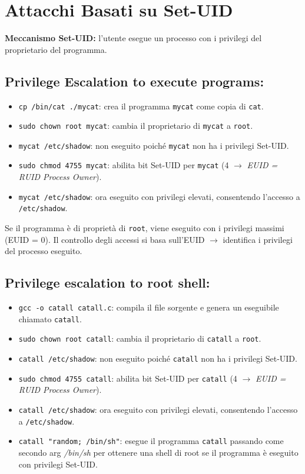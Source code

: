 \section{Attacchi Basati su Set-UID}

\textbf{Meccanismo Set-UID:} l'utente esegue un processo con i privilegi del proprietario del programma. 

\subsection{Privilege Escalation to execute programs:}
\begin{itemize}
    \item \texttt{cp /bin/cat ./mycat}: crea il programma \texttt{mycat} come copia di \texttt{cat}.
    \item \texttt{sudo chown root mycat}: cambia il proprietario di \texttt{mycat} a \texttt{root}.
    \item \texttt{mycat /etc/shadow}: non eseguito poiché \texttt{mycat} non ha i privilegi Set-UID.
    \item \texttt{sudo chmod 4755 mycat}: abilita bit Set-UID per \texttt{mycat} (4 $\rightarrow$ \textit{EUID = RUID Process Owner}).
    \item \texttt{mycat /etc/shadow}: ora eseguito con privilegi elevati, consentendo l'accesso a \texttt{/etc/shadow}.
\end{itemize}

\noindent Se il programma è di proprietà di \texttt{root}, viene eseguito con i privilegi massimi (EUID = 0). Il controllo degli accessi si basa sull'EUID $\rightarrow$ identifica i privilegi del processo eseguito.

\subsection{Privilege escalation to root shell:}
\begin{itemize}
    \item \texttt{gcc -o catall catall.c}: compila il file sorgente e genera un eseguibile chiamato \texttt{catall}.
    \item \texttt{sudo chown root catall}: cambia il proprietario di \texttt{catall} a \texttt{root}.
    \item \texttt{catall /etc/shadow}: non eseguito poiché \texttt{catall} non ha i privilegi Set-UID.
    \item \texttt{sudo chmod 4755 catall}: abilita bit Set-UID per \texttt{catall} (4 $\rightarrow$ \textit{EUID = RUID Process Owner}).
    \item \texttt{catall /etc/shadow}: ora eseguito con privilegi elevati, consentendo l'accesso a \texttt{/etc/shadow}.
    \item \texttt{catall "random; /bin/sh"}: esegue il programma \texttt{catall} passando come secondo arg \textit{/bin/sh} per ottenere una shell di root se il programma è eseguito con privilegi Set-UID.
\end{itemize}

